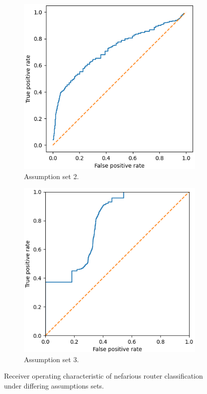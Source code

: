 \begin{figure}[H]
    \centering
    \begin{subfigure}{0.475\textwidth}
        \includegraphics[width=\textwidth]{figs/results/nobel-germany_case2_roc.png}
        \caption{Assumption set 2.}
    \end{subfigure}
    \begin{subfigure}{0.475\textwidth}
        \includegraphics[width=\textwidth]{figs/results/nobel-germany_case3_roc.png}
        \caption{Assumption set 3.}
    \end{subfigure}
    \caption{Receiver operating characteristic of nefarious router classification under differing assumptions sets.}
    \label{fig:RnovelROCcurves}
\end{figure}

